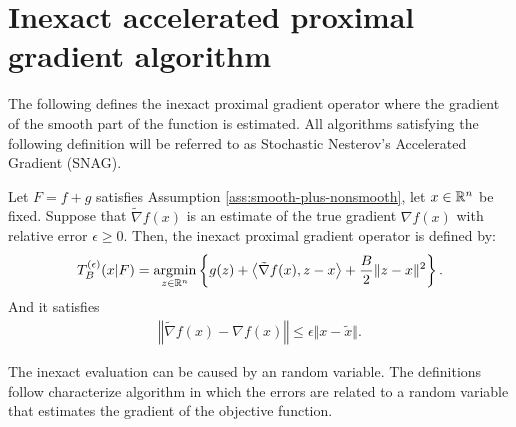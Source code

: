 \documentclass[12pt]{article}
\begin{document}
\section{Inexact accelerated proximal gradient algorithm}
    The following defines the inexact proximal gradient operator where the gradient of the smooth part of the function is estimated. 
    All algorithms satisfying the following definition will be referred to as Stochastic Nesterov's Accelerated Gradient (SNAG). 
    \begin{definition}
        Let $F = f + g$ satisfies Assumption \ref{ass:smooth-plus-nonsmooth}, let $x \in \mathbb R^n$ be fixed. 
        Suppose that $\tilde \nabla f(x)$ is an estimate of the true gradient $\nabla f(x)$ with relative error $\epsilon \ge 0$. 
        Then, the inexact proximal gradient operator is defined by: 
        \begin{align*}
            T_B^{(\epsilon)}(x | F) = \mathop{\rm argmin}\limits_{z \in \mathbb R^n}\left\lbrace
                g(z) + \left\langle \tilde \nabla f(x), z - x\right\rangle
                + \frac{B}{2}\Vert z - x\Vert^2
            \right\rbrace. 
        \end{align*}
        And it satisfies 
        \begin{align*}
            \left\Vert \tilde \nabla f(x) - \nabla f(x)\right\Vert \le \epsilon \Vert x - \tilde x\Vert. 
        \end{align*}
    \end{definition}
    The inexact evaluation can be caused by an random variable. 
    The definitions follow characterize algorithm in which the errors are related to a random variable that estimates the gradient of the objective function. 
    \begin{definition}
        
    \end{definition}
\end{document}
